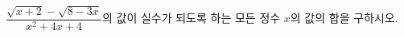 \hspace*{2mm}\begin{minipage}[t]{\dimexpr\linewidth-2mm\relax}\vspace{0pt}
$\dfrac{\sqrt{x+2}-\sqrt{8-3x}}{x^2+4x+4}$의 값이 실수가 되도록 하는 모든 정수 $x$의 값의 합을 구하시오.\end{minipage}
